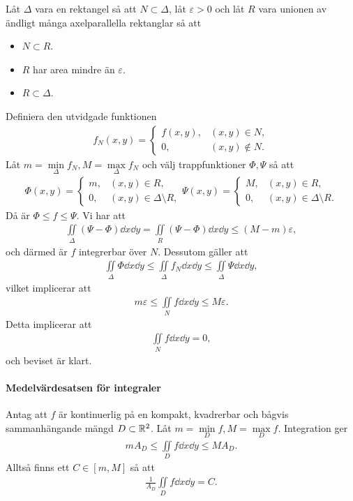 \proof
Låt $\Delta$ vara en rektangel så att $N\subset\Delta$, låt $\varepsilon > 0$ och låt $R$ vara unionen av ändligt många axelparallella rektanglar så att
\begin{itemize}
	\item $N\subset R$.
	\item $R$ har area mindre än $\varepsilon$.
	\item $R\subset\Delta$.
\end{itemize}
Definiera den utvidgade funktionen
\begin{align*}
	f_N(x, y) =
	\begin{cases}
		f(x, y), &(x, y)\in N, \\
		0,       &(x, y)\not\in N.
	\end{cases}
\end{align*}
Låt $m = \min\limits_{\Delta}f_N, M = \max\limits_{\Delta}f_N$ och välj trappfunktioner $\Phi, \Psi$ så att
\begin{align*}
	\Phi(x, y) =
	\begin{cases}
		m, &(x, y)\in R, \\
		0, &(x, y)\in \Delta\setminus R,
	\end{cases}
	\Psi(x, y) =
	\begin{cases}
		M, &(x, y)\in R, \\
		0, &(x, y)\in \Delta\setminus R.
	\end{cases}
\end{align*}
Då är $\Phi\leq f\leq\Psi$. Vi har att
\begin{align*}
	\iint\limits_{\Delta}(\Psi - \Phi)\dd{x}\dd{y} = \iint\limits_{R}(\Psi - \Phi)\dd{x}\dd{y}\leq(M - m)\varepsilon,
\end{align*}
och därmed är $f$ integrerbar över $N$. Dessutom gäller att
\begin{align*}
	\iint\limits_{\Delta}\Phi\dd{x}\dd{y}\leq\iint\limits_{\Delta}f_{N}\dd{x}\dd{y}\leq\iint\limits_{\Delta}\Psi\dd{x}\dd{y},
\end{align*}
vilket implicerar att
\begin{align*}
	m\varepsilon\leq\iint\limits_{N}f\dd{x}\dd{y}\leq M\varepsilon.
\end{align*}
Detta implicerar att
\begin{align*}
	\iint\limits_{N}f\dd{x}\dd{y} = 0,
\end{align*}
och beviset är klart.

\paragraph{Medelvärdesatsen för integraler}
Antag att $f$ är kontinuerlig på en kompakt, kvadrerbar och bågvis sammanhängande mängd $D\subset\mathbb{R}^2$. Låt $m = \min\limits_{D}f, M = \max\limits_{D}f$. Integration ger
\begin{align*}
	mA_{D}\leq\iint\limits_{D}f\dd{x}\dd{y}\leq MA_{D}.
\end{align*}
Alltså finns ett $C\in [m, M]$ så att
\begin{align*}
	\frac{1}{A_{D}}\iint\limits_{D}f\dd{x}\dd{y} = C.
\end{align*}

